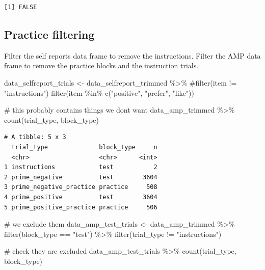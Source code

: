 \documentclass[
  letterpaper,
  DIV=11,
  numbers=noendperiod]{scrreprt}
\newenvironment{Shaded}{\begin{snugshade}}{\end{snugshade}}
\newcommand{\CommentTok}[1]{\textcolor[rgb]{0.37,0.37,0.37}{#1}}
\newcommand{\FunctionTok}[1]{\textcolor[rgb]{0.28,0.35,0.67}{#1}}
\newcommand{\NormalTok}[1]{\textcolor[rgb]{0.00,0.23,0.31}{#1}}
\newcommand{\OtherTok}[1]{\textcolor[rgb]{0.00,0.23,0.31}{#1}}
\newcommand{\SpecialCharTok}[1]{\textcolor[rgb]{0.37,0.37,0.37}{#1}}
\newcommand{\StringTok}[1]{\textcolor[rgb]{0.13,0.47,0.30}{#1}}
\begin{document}
\begin{verbatim}
[1] FALSE
\end{verbatim}

\subsection{Practice filtering}\label{practice-filtering}

Filter the self reports data frame to remove the instructions. Filter
the AMP data frame to remove the practice blocks and the instruction
trials.

\begin{Shaded}
\begin{Highlighting}[]
\NormalTok{data\_selfreport\_trials }\OtherTok{\textless{}{-}}\NormalTok{ data\_selfreport\_trimmed }\SpecialCharTok{\%\textgreater{}\%}
  \CommentTok{\#filter(item != "instructions")}
  \FunctionTok{filter}\NormalTok{(item }\SpecialCharTok{\%in\%} \FunctionTok{c}\NormalTok{(}\StringTok{"positive"}\NormalTok{, }\StringTok{"prefer"}\NormalTok{, }\StringTok{"like"}\NormalTok{))}

\CommentTok{\# this probably contains things we don\textquotesingle{}t want}
\NormalTok{data\_amp\_trimmed }\SpecialCharTok{\%\textgreater{}\%}
  \FunctionTok{count}\NormalTok{(trial\_type, block\_type)}
\end{Highlighting}
\end{Shaded}

\begin{verbatim}
# A tibble: 5 x 3
  trial_type              block_type     n
  <chr>                   <chr>      <int>
1 instructions            test           2
2 prime_negative          test        3604
3 prime_negative_practice practice     508
4 prime_positive          test        3604
5 prime_positive_practice practice     506
\end{verbatim}

\begin{Shaded}
\begin{Highlighting}[]
\CommentTok{\# we exclude them}
\NormalTok{data\_amp\_test\_trials }\OtherTok{\textless{}{-}}\NormalTok{ data\_amp\_trimmed }\SpecialCharTok{\%\textgreater{}\%}
  \FunctionTok{filter}\NormalTok{(block\_type }\SpecialCharTok{==} \StringTok{"test"}\NormalTok{) }\SpecialCharTok{\%\textgreater{}\%}
  \FunctionTok{filter}\NormalTok{(trial\_type }\SpecialCharTok{!=} \StringTok{"instructions"}\NormalTok{)}

\CommentTok{\# check they are excluded}
\NormalTok{data\_amp\_test\_trials }\SpecialCharTok{\%\textgreater{}\%}
  \FunctionTok{count}\NormalTok{(trial\_type, block\_type)}
\end{Highlighting}
\end{Shaded}
\end{document}
